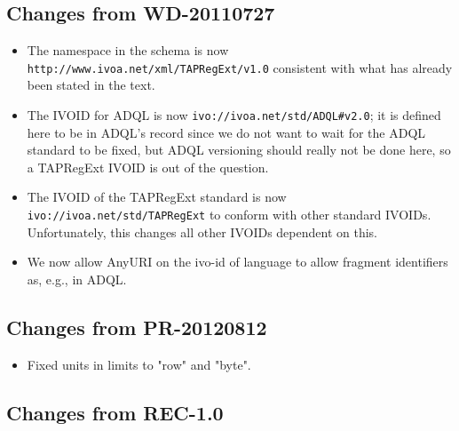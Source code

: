 \documentclass{ivoa}
\begin{document}
\subsection{Changes from WD-20110727}

\label{changes-20110727}

\begin{itemize}

\item The namespace in the schema is now \nolinkurl{http://www.ivoa.net/xml/TAPRegExt/v1.0} consistent with what has already been stated in the text.{}

\item The IVOID for ADQL is now
\nolinkurl{ivo://ivoa.net/std/ADQL\#v2.0}; it is defined here to be in
ADQL's record since we do not want to wait for the ADQL standard to be
fixed, but ADQL versioning should really not be done here, so a
TAPRegExt IVOID is out of the question.{}

\item The IVOID of the TAPRegExt standard is now
\texttt{ivo://ivoa.net/std/TAPRegExt} to conform with other standard
IVOIDs.  Unfortunately, this changes
all other IVOIDs dependent on this.{}

\item We now allow AnyURI on the ivo-id of language to allow fragment identifiers as, e.g., in ADQL.{}

\end{itemize}


\subsection{Changes from PR-20120812}

\label{changes-20120208}

\begin{itemize}

\item Fixed units in limits to "row" and "byte".{}

\end{itemize}

\subsection{Changes from REC-1.0}

\label{changes-rec-1.0}
\end{document}

